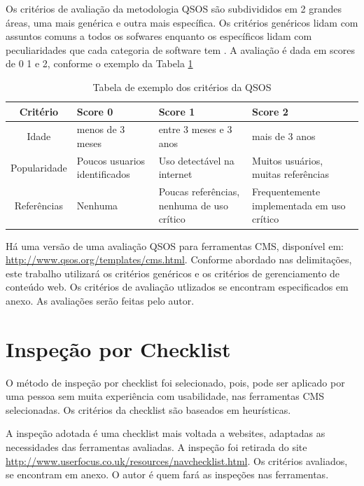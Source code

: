 Os critérios de avaliação da metodologia QSOS são subdivididos em 2 grandes áreas, uma mais genérica e outra mais específica. Os critérios genéricos lidam com assuntos comuns a todos os sofwares enquanto os específicos lidam com peculiaridades que cada categoria de software tem \cite{openbrr_qsos}. A avaliação é dada em scores de 0 1 e 2, conforme o exemplo da Tabela \ref{table:qsos_avaliacao}  

\begin{table}[ht]
\caption{Tabela de exemplo dos critérios da QSOS } %
\centering %
\begin{tabular}{c | p{3cm} | p{4.2cm} | p{4cm}} %
\hline\hline %
Critério & Score 0 & Score 1 & Score 2  \\ [0.5ex] %
\hline %
Idade      & menos de 3 meses  & entre 3 meses e 3 anos   & mais de 3 anos    \\ \hline
Popularidade & Poucos usuarios identificados  & Uso detectável na internet & Muitos usuários, muitas referências    \\ \hline
Referências & Nenhuma   & Poucas referências, nenhuma de uso crítico  & Frequentemente implementada em uso crítico \\ [1ex] %
\hline %
\end{tabular}
\label{table:qsos_avaliacao} %
\end{table}

Há uma versão de uma avaliação QSOS para ferramentas CMS, disponível em: \url{http://www.qsos.org/templates/cms.html}. Conforme abordado nas delimitações, este trabalho utilizará os critérios genéricos e os critérios de gerenciamento de conteúdo web. Os critérios de avaliação utlizados se encontram especificados em anexo. As avaliações serão feitas pelo autor.

\section{Inspeção por Checklist}

O método de inspeção por checklist foi selecionado, pois, pode ser aplicado por uma pessoa sem muita experiência com usabilidade, nas ferramentas CMS selecionadas. Os critérios da checklist são baseados em heurísticas.

A inspeção adotada é uma checklist mais voltada a websites, adaptadas as necessidades das ferramentas avaliadas. A inspeção foi retirada do site \url{http://www.userfocus.co.uk/resources/navchecklist.html}. Os critérios avaliados, se encontram em anexo. O autor é quem fará as inspeções nas ferramentas.


